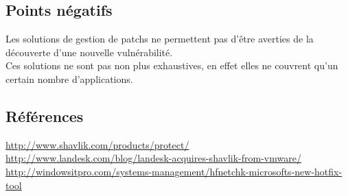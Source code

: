 \subsection{Points négatifs}
Les solutions de gestion de patchs ne permettent pas d’être averties de la découverte d’une nouvelle vulnérabilité.\\

Ces solutions ne sont pas non plus exhaustives, en effet elles ne couvrent qu'un certain nombre d’applications.\\

\subsection{Références}
\small
\noindent
\url{http://www.shavlik.com/products/protect/}\newline
\url{http://www.landesk.com/blog/landesk-acquires-shavlik-from-vmware/}\newline
\url{http://windowsitpro.com/systems-management/hfnetchk-microsofts-new-hotfix-tool}\newline
\normalsize
